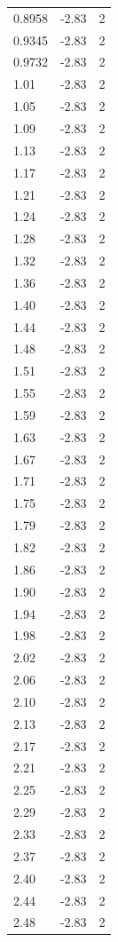 \begin{longtable}{lrr}
  0.8958 & -2.83 & 2 \\
  0.9345 & -2.83 & 2 \\
  0.9732 & -2.83 & 2 \\
  1.01 & -2.83 & 2 \\
  1.05 & -2.83 & 2 \\
  1.09 & -2.83 & 2 \\
  1.13 & -2.83 & 2 \\
  1.17 & -2.83 & 2 \\
  1.21 & -2.83 & 2 \\
  1.24 & -2.83 & 2 \\
  1.28 & -2.83 & 2 \\
  1.32 & -2.83 & 2 \\
  1.36 & -2.83 & 2 \\
  1.40 & -2.83 & 2 \\
  1.44 & -2.83 & 2 \\
  1.48 & -2.83 & 2 \\
  1.51 & -2.83 & 2 \\
  1.55 & -2.83 & 2 \\
  1.59 & -2.83 & 2 \\
  1.63 & -2.83 & 2 \\
  1.67 & -2.83 & 2 \\
  1.71 & -2.83 & 2 \\
  1.75 & -2.83 & 2 \\
  1.79 & -2.83 & 2 \\
  1.82 & -2.83 & 2 \\
  1.86 & -2.83 & 2 \\
  1.90 & -2.83 & 2 \\
  1.94 & -2.83 & 2 \\
  1.98 & -2.83 & 2 \\
  2.02 & -2.83 & 2 \\
  2.06 & -2.83 & 2 \\
  2.10 & -2.83 & 2 \\
  2.13 & -2.83 & 2 \\
  2.17 & -2.83 & 2 \\
  2.21 & -2.83 & 2 \\
  2.25 & -2.83 & 2 \\
  2.29 & -2.83 & 2 \\
  2.33 & -2.83 & 2 \\
  2.37 & -2.83 & 2 \\
  2.40 & -2.83 & 2 \\
  2.44 & -2.83 & 2 \\
  2.48 & -2.83 & 2 \\

\end{longtable}
